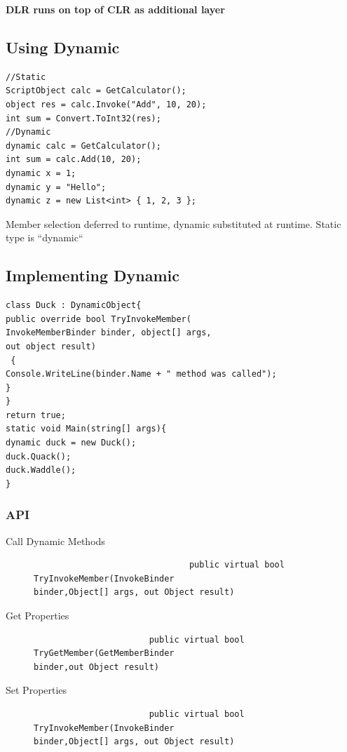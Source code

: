 \documentclass[a4paper,10pt]{scrartcl}
\begin{document}
\textbf{DLR runs on top of CLR as additional layer}


\subsection{Using Dynamic}
\begin{lstlisting}[caption=using dynamic]
//Static
ScriptObject calc = GetCalculator();
object res = calc.Invoke("Add", 10, 20);
int sum = Convert.ToInt32(res);
//Dynamic
dynamic calc = GetCalculator();
int sum = calc.Add(10, 20);
dynamic x = 1;
dynamic y = "Hello";
dynamic z = new List<int> { 1, 2, 3 };

\end{lstlisting}

Member selection deferred to runtime, dynamic substituted at runtime. Static type is ``dynamic``

\subsection{Implementing Dynamic}
\begin{lstlisting}[caption=dynamic object example]
 class Duck : DynamicObject{
public override bool TryInvokeMember(
InvokeMemberBinder binder, object[] args,
out object result)
 {
Console.WriteLine(binder.Name + " method was called");
}
}
return true;
static void Main(string[] args){
dynamic duck = new Duck();
duck.Quack();
duck.Waddle();
}

\end{lstlisting}

\subsubsection{API}

\begin{description}
 \item [Call Dynamic Methods] \begin{lstlisting}
                               public virtual bool TryInvokeMember(InvokeBinder
binder,Object[] args, out Object result)

                              \end{lstlisting}
\item[Get Properties] \begin{lstlisting}
                       public virtual bool TryGetMember(GetMemberBinder
binder,out Object result)

                      \end{lstlisting}
                      
\item[Set Properties] \begin{lstlisting}
                       public virtual bool TryInvokeMember(InvokeBinder
binder,Object[] args, out Object result)

                      \end{lstlisting}

\end{description}
\end{document}
